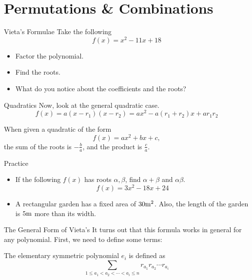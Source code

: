 \documentclass[aspectratio=169,xcolor=dvipsnames]{beamer}
\begin{document}
\section{Permutations & Combinations}

\begin{frame}[t]{Vieta's Formulae}
    Take the following
    \[
    f(x)=x^2-11x+18
    \]
    
    \begin{itemize}
        \item Factor the polynomial.
        \item Find the roots.
        \item What do you notice about the coefficients and the roots?
    \end{itemize}
\end{frame}

\begin{frame}[t]{Quadratics}
    Now, look at the general quadratic case.
    \[
    f(x)=a(x-r_1)(x-r_2)=ax^2-a(r_1+r_2)x+ar_1r_2
    \]
    
    \begin{theorem}
        When given a quadratic of the form
        \[f(x)=ax^2+bx+c,\]
        the sum of the roots is $-\frac ba$, and the product is $\frac ca$.
    \end{theorem}
\end{frame}

\begin{frame}[t]{Practice}
    \begin{itemize}
        \item If the following \(f(x)\) has roots \(\alpha, \beta\), find \(\alpha+\beta\) and \(\alpha\beta\).
        \[f(x)=3x^2-18x+24\]
        \item A rectangular garden has a fixed area of \(30 \rm m^2\). Also, the length of the garden is \(5 \rm m\) more than its width. 
    \end{itemize}
\end{frame}

\begin{frame}[t]{The General Form of Vieta's}
    It turns out that this formula works in general for any polynomial. First, we need to define some terms:
    \begin{definition}
        The elementary symmetric polynomial $e_i$ is defined as
        \[\sum_{1\le a_1<a_2<\cdots<a_i\le n}r_{a_1}r_{a_2}\cdots r_{a_i}\]     
        
    \end{definition}
\end{frame}
\end{document}
